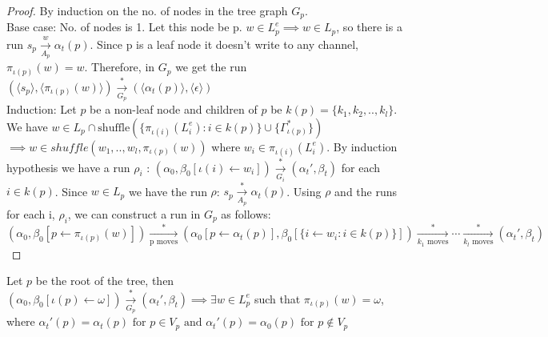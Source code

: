 \documentclass[a4paper,UKenglish,cleveref, autoref, thm-restate]{lipics-v2019}
\begin{document}
\begin{proof} By induction on the no. of nodes in the tree graph $G_p$.\\
\hspace*{0.5cm}Base case: No. of nodes is 1. Let this node be p.  $w \in L_p^e \implies w \in L_p$, so there is a run  $s_p \xrightarrow[A_p]{w} \alpha_t(p)$. Since p is a leaf node it doesn't write to any channel, $\pi_{\iota(p)}(w) = w$. Therefore, in $G_p$ we get the run $(\langle s_p \rangle , \langle \pi_{\iota(p)}(w) \rangle ) \xrightarrow[G_p]{*} (\langle \alpha_t(p) \rangle , \langle \epsilon \rangle )$\\
\hspace*{0.5cm}Induction: Let $p$ be a non-leaf node and children of $p$ be $k(p) = \{k_1, k_2, .., k_l\}$. We have $w \in  L_p \cap \text{shuffle}(\{ \pi_{\iota(i)}(L_i^e)  : i \in k(p)\} \cup \{\Gamma_{\iota(p)}^*\})$
$\implies w \in shuffle(w_1,.., w_l,\pi_{\iota(p)}(w) )$ where $w_i \in \pi_{\iota(i)}(L_i^e)$. 
By induction hypothesis we have a  run $\rho_i$ : $(\alpha_0, \beta_0[\iota(i) \leftarrow w_i]) \xrightarrow[G_i]{*} (\alpha_t', \beta_t)$ for each $i \in k(p)$. 
Since $w \in L_p$ we have the run $\rho$:  $s_p \xrightarrow[A_p]{*} \alpha_t(p)$. 
Using $\rho$ and the runs for each i, $\rho_i$, we can construct a run in $G_p$ as follows: 
$(\alpha_0, \beta_0[p \leftarrow \pi_{\iota(p)}(w)]) \xrightarrow[\text{p moves}]{*} (\alpha_0[p \leftarrow \alpha_t(p)], \beta_0[\{i \leftarrow w_i : i \in k(p)\}]) \xrightarrow[\text{$k_1$ moves}]{*} \cdots \xrightarrow[\text{$k_l$ moves}]{*} (\alpha_t', \beta_t) $
\end{proof}
    


   
\begin{lemma}\label{testenv-lemma}

Let $p$ be the root of the tree, then \\
\hspace*{2cm}$(\alpha_0, \beta_0[\iota(p) \leftarrow \omega]) \xrightarrow[G_p]{*} (\alpha_t', \beta_t) \implies \exists w \in L_p^e $ such that $\pi_{\iota(p)}(w) = \omega$, \\
where $\alpha_t'(p) = \alpha_t(p) \text{ for } p \in V_p  \text{ and } \alpha_t'(p) = \alpha_0(p) \text{ for } p \notin V_p$


\end{lemma}
   
\end{document}
